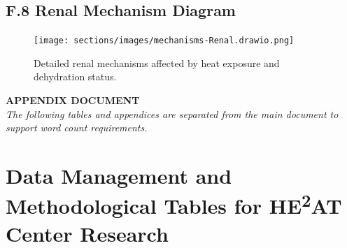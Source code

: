 \graphicspath{{./}{./sections/images/}{./images/}}\documentclass[12pt,a4paper,landscape]{article}
\begin{document}
\subsection*{F.8 Renal Mechanism Diagram}
\begin{figure}[H]
    \centering
    \texttt{[image: sections/images/mechanisms-Renal.drawio.png]}
    \caption{Detailed renal mechanisms affected by heat exposure and dehydration status.}
    \label{fig:renal}
\end{figure}

\begin{center}
    \Large\textbf{APPENDIX DOCUMENT}\\[0.5em]
    \normalsize\textit{The following tables and appendices are separated from the main document to support word count requirements.}
\end{center}

\section*{Data Management and Methodological Tables for HE\textsuperscript{2}AT Center Research}

\end{document}
